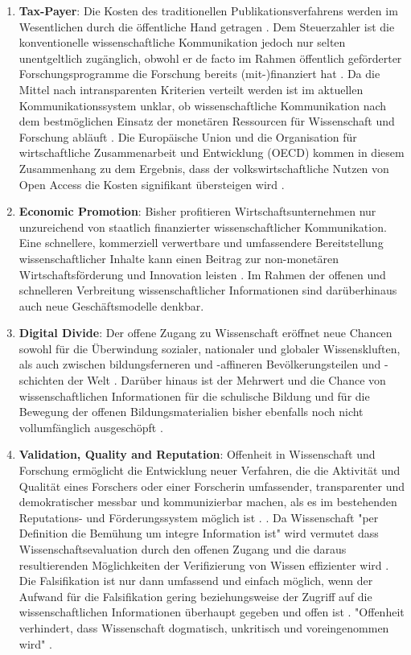 \begin{enumerate}
\item \textbf{Tax-Payer}: Die Kosten des traditionellen Publikationsverfahrens werden im Wesentlichen durch die öffentliche Hand getragen \cite{Mueller_2010}. Dem Steuerzahler ist die konventionelle wissenschaftliche Kommunikation jedoch nur selten unentgeltlich zugänglich, obwohl er de facto im Rahmen öffentlich geförderter Forschungsprogramme die Forschung bereits (mit-)finanziert hat \cite{Suber_2003b} \cite{Resnik_2005} \cite{Baggs_2006} \cite{Woelfle_2011} \cite{Beverungen_2012} \cite{Adema_2014}. Da die Mittel nach intransparenten Kriterien verteilt werden ist im aktuellen Kommunikationssystem unklar, ob wissenschaftliche Kommunikation nach dem bestmöglichen Einsatz der monetären Ressourcen für Wissenschaft und Forschung abläuft \cite{Glasziou_2014} \cite{Altman_1994}. Die Europäische Union und die Organisation für wirtschaftliche Zusammenarbeit und Entwicklung (OECD) kommen in diesem Zusammenhang zu dem Ergebnis, dass der volkswirtschaftliche Nutzen von Open Access die Kosten signifikant übersteigen wird \cite{Cloes_2009} \cite{OECD_2015} \cite{eu_council_2007}.
\item \textbf{Economic Promotion}: Bisher profitieren Wirtschaftsunternehmen nur unzureichend von staatlich finanzierter wissenschaftlicher Kommunikation. Eine schnellere, kommerziell verwertbare und umfassendere Bereitstellung wissenschaftlicher Inhalte kann einen Beitrag zur non-monetären Wirtschaftsförderung und Innovation leisten \cite{European_Commission_2015a} \cite{OECD_2015} \cite{Heise_2012b} \cite{OECD_2004}. Im Rahmen der offenen und schnelleren Verbreitung wissenschaftlicher Informationen sind darüberhinaus auch neue Geschäftsmodelle denkbar.
\item \textbf{Digital Divide}: Der offene Zugang zu Wissenschaft eröffnet neue Chancen sowohl für die Überwindung sozialer, nationaler und globaler Wissenskluften, als auch zwischen bildungsferneren und -affineren Bevölkerungsteilen und -schichten der Welt \cite{BOAI_2012}. Darüber hinaus ist der Mehrwert und die Chance von wissenschaftlichen Informationen für die schulische Bildung und für die Bewegung der offenen Bildungsmaterialien bisher ebenfalls noch nicht vollumfänglich ausgeschöpft \cite{Heise_2013b}.
\item \textbf{Validation, Quality and Reputation}: Offenheit in Wissenschaft und Forschung ermöglicht die Entwicklung neuer Verfahren, die die Aktivität und Qualität eines Forschers oder einer Forscherin umfassender, transparenter und demokratischer messbar und kommunizierbar machen, als es im bestehenden Reputations- und Förderungssystem möglich ist \cite{Grand_2012}. \cite{Chalmers_2009}. Da Wissenschaft "per Definition die Bemühung um integre Information ist" \cite{Umstaetter_2007} wird vermutet dass Wissenschaftsevaluation durch den offenen Zugang und die daraus resultierenden Möglichkeiten der Verifizierung von Wissen effizienter wird \cite{Nosek_2015}. Die Falsifikation ist nur dann umfassend und einfach möglich, wenn der Aufwand für die Falsifikation gering beziehungsweise der Zugriff auf die wissenschaftlichen Informationen überhaupt gegeben \cite{Umstaetter_2007} und offen ist \cite{Peters_2014}. "Offenheit verhindert, dass Wissenschaft dogmatisch, unkritisch und voreingenommen wird" \cite{Resnik_2005}.

\end{enumerate}

